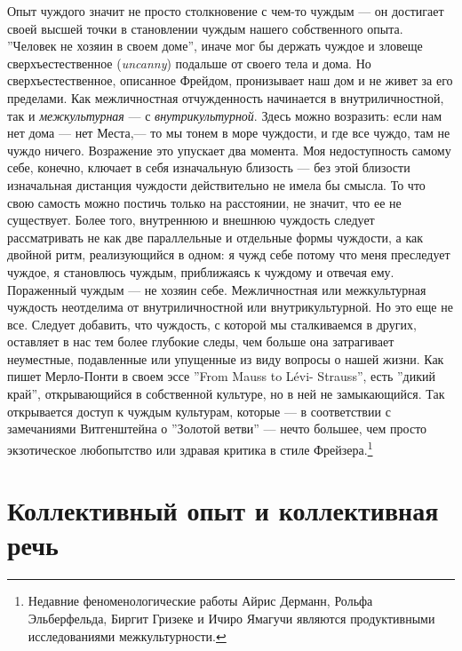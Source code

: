 \documentclass[12pt]{book}
\begin{document}
Опыт чуждого значит не просто столкновение с чем-то чуждым --- он достигает своей высшей точки в становлении чуждым нашего собственного опыта. ''Человек не хозяин в своем доме'', иначе мог бы держать чуждое и зловеще сверхъестественное (\textit{uncanny}) подальше от своего тела и дома. Но сверхъестественное, описанное Фрейдом, пронизывает наш дом и не живет за его пределами. Как межличностная отчужденность начинается в внутриличностной, так и \textit{межкультурная} --- с \textit{внутрикультурной}. Здесь можно возразить: если нам нет дома --- нет Места,--- то мы тонем в море чуждости, и где все чуждо, там не чуждо ничего. Возражение это упускает два момента. Моя недоступность самому себе, конечно, ключает в себя изначальную близость --- без этой близости изначальная дистанция чуждости действительно не имела бы смысла. То что свою самость можно постичь только на расстоянии, не значит, что ее не существует. Более того, внутреннюю и внешнюю чуждость следует рассматривать не как две параллельные и отдельные формы чуждости, а как двойной ритм, реализующийся в одном: я чужд себе потому что меня преследует чуждое, я становлюсь чуждым, приближаясь к чуждому и отвечая ему. Пораженный чуждым --- не хозяин себе. Межличностная или межкультурная чуждость неотделима от внутриличностной или внутрикультурной. Но это еще не все. Следует добавить, что чуждость, с которой мы сталкиваемся в других, оставляет в нас тем более глубокие следы, чем больше она затрагивает неуместные, подавленные или упущенные из виду вопросы о нашей жизни. Как пишет Мерло-Понти в своем эссе ''From Mauss to Lévi- Strauss'', есть ''дикий край'', открывающийся в собственной культуре, но в ней не замыкающийся. Так открывается доступ к чуждым культурам, которые --- в соответствии с замечаниями Витгенштейна о ''Золотой ветви'' --- нечто большее, чем просто экзотическое любопытство или здравая критика в стиле Фрейзера.\footnote{Недавние феноменологические работы Айрис Дерманн, Рольфа Эльберфельда, Биргит Гризеке и Ичиро Ямагучи являются продуктивными исследованиями межкультурности.}

\section{Коллективный опыт и коллективная речь}
\end{document}
